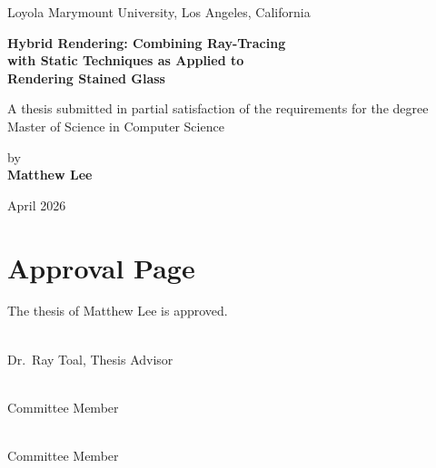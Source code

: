 \documentclass[12pt]{article}
\begin{document}
\doublespacing


\begin{titlepage}
  \centering
  \thispagestyle{empty}

  {\large Loyola Marymount University, Los Angeles, California}

  \vspace{1.5cm}

  {\Huge\bfseries
    Hybrid Rendering: Combining Ray-Tracing\\[6pt]
    with Static Techniques as Applied to\\[6pt]
    Rendering Stained Glass
  }

  \vspace{1.5cm}

  {A thesis submitted in partial satisfaction of the requirements for the degree Master of Science in Computer Science}

  \vspace{1.5cm}

  {by}\\[8pt]
  {\LARGE\bfseries Matthew Lee}

  \vfill

  {April 2026}
\end{titlepage}

\clearpage
\section*{Approval Page}

The thesis of Matthew Lee is approved.

\vspace{2cm}
\noindent\underline{\hspace{8cm}}\\[4pt]
Dr.\ Ray Toal, Thesis Advisor

\vspace{1.5cm}
\noindent\underline{\hspace{8cm}}\\[4pt]
Committee Member

\vspace{1.5cm}
\noindent\underline{\hspace{8cm}}\\[4pt]
Committee Member

\clearpage
\end{document}
